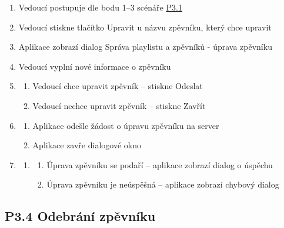 \begin{enumerate}
    \item Vedoucí postupuje dle bodu 1--3 scénáře \hyperref[P3.1]{P3.1}
    \item Vedoucí stiskne tlačítko Upravit u názvu zpěvníku, který chce upravit
    \item Aplikace zobrazí dialog Správa playlistu a zpěvníků - úprava zpěvníku
    \item Vedoucí vyplní nové informace o zpěvníku
    \item \begin{enumerate}
        \item Vedoucí chce upravit zpěvník -- stiskne Odeslat
        \item Vedoucí nechce upravit zpěvník -- stiskne Zavřít
    \end{enumerate}
    \item \begin{enumerate}
        \item Aplikace odešle žádost o úpravu zpěvníku na server
        \item Aplikace zavře dialogové okno
    \end{enumerate}
    \item \begin{enumerate}
        \item \begin{enumerate}
            \item Úprava zpěvníku se podaří -- aplikace zobrazí dialog o úspěchu
	    \item Úprava zpěvníku je neúspěšná -- aplikace zobrazí chybový dialog
        \end{enumerate}
    \end{enumerate}
\end{enumerate}

\subsection{P3.4 Odebrání zpěvníku}
\label{P3.4}

